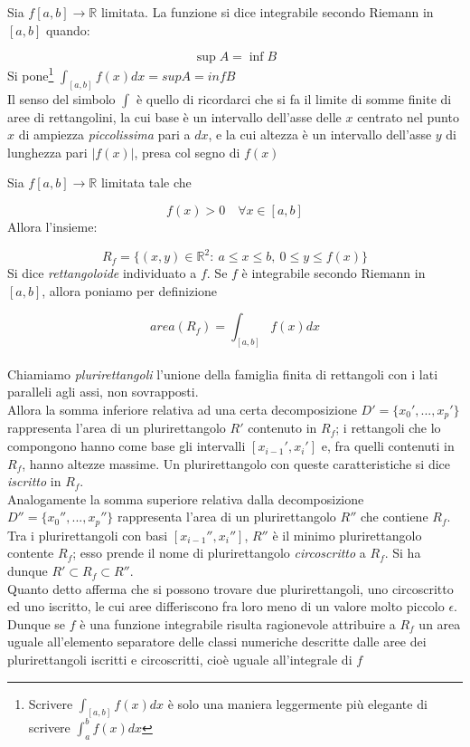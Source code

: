 \documentclass[12pt]{article}
\newcounter{definitioncounter}
\newenvironment{definition}[2]
[DEFINIZIONE \thesection.\thedefinitioncounter] {\refstepcounter{definitioncounter}\begin {trivlist}
\item[\hskip \labelsep {\bfseries #1} \hskip \labelsep {\bfseries #2}]}{\end {trivlist}}
\newcommand{\R}{\mathbb{R}}
\begin{document}
\noindent Sia $f[a,b] \to \R$ limitata. La funzione si dice integrabile secondo Riemann in $[a,b]$ quando: 

$$\sup A = \inf B $$
Si pone\footnote{Scrivere $\displaystyle \int_{[a,b]} f(x) dx$ è solo una maniera leggermente più elegante di scrivere $\displaystyle \int_{a}^b f(x) dx$ } $\displaystyle \int_{[a,b]} f(x) dx = supA = inf B$ \\

\noindent Il senso del simbolo $\int$ è quello di ricordarci che si fa il limite di somme finite di aree di rettangolini, la cui base è un intervallo dell'asse delle $x$ centrato nel punto $x$ di ampiezza \emph{piccolissima} pari a $dx$, e la cui altezza è un intervallo dell'asse $y$ di lunghezza pari $|f(x)|$, presa col segno di $f(x)$

\begin{definition}{}
Sia $f[a,b] \to \R$ limitata tale che 

$$ f(x) > 0 \quad \forall x \in [a,b] $$
Allora l'insieme: 

$$ R_f = \{(x,y) \in \R^2: ~ a \leq x \leq b , ~ 0 \leq y \leq f(x)\}$$
Si dice \emph{rettangoloide} individuato a $f$. Se $f$ è integrabile secondo Riemann in $[a,b]$, allora poniamo per definizione

$$ area(R_f) = \displaystyle \int_{[a,b]} f(x) dx $$ \\
Chiamiamo \textit{plurirettangoli} l'unione della famiglia finita di rettangoli con i lati paralleli agli assi, non sovrapposti. \\

\noindent Allora la somma inferiore relativa ad una certa decomposizione $D'=\{x_0', ... , x_p'\}$ rappresenta l'area di un plurirettangolo $R'$ contenuto in $R_f$; i rettangoli che lo compongono hanno come base gli intervalli $[x_{i-1}', x_i']$ e, fra quelli contenuti in $R_f$, hanno altezze massime. Un plurirettangolo con queste caratteristiche si dice \textit{iscritto} in $R_f$. \\

\noindent Analogamente la somma superiore relativa dalla decomposizione $D''= \{x_0'', ... , x_p''\}$ rappresenta l'area di un plurirettangolo $R''$ che contiene $R_f$. Tra i plurirettangoli con basi $[x_{i-1}'', x_i'']$, $R'' $ è il minimo plurirettangolo contente $R_f$; esso prende il nome di plurirettangolo \textit{circoscritto} a $R_f$. Si ha dunque $R'\subset R_f \subset R''$. \\

\noindent Quanto detto afferma che si possono trovare due plurirettangoli, uno circoscritto ed uno iscritto, le cui aree differiscono fra loro meno di un valore molto piccolo $\epsilon$. Dunque se $f$ è una funzione integrabile risulta ragionevole attribuire a $R_f$ un area uguale all'elemento separatore delle classi numeriche descritte dalle aree dei plurirettangoli iscritti e circoscritti, cioè uguale all'integrale di $f$ \\
\end{definition}
\end{document}

